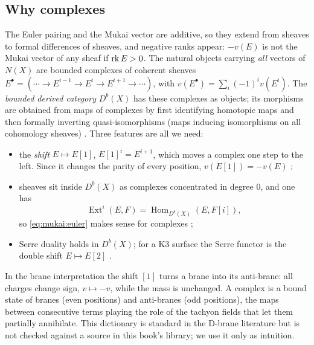 \subsection{Why complexes}
The Euler pairing and the Mukai vector are additive, so they extend from sheaves to formal
differences of sheaves, and negative ranks appear: $-v(E)$ is not the Mukai vector of any sheaf if
$\operatorname{rk} E>0$. The natural objects carrying \emph{all} vectors of $N(X)$ are bounded complexes of
coherent sheaves
$E^\bullet=(\cdots\to E^{i-1}\to E^i\to E^{i+1}\to\cdots)$, with
$v(E^\bullet)=\sum_i(-1)^iv(E^i)$. The \emph{bounded derived category}
$D^b(X)$ has these complexes as objects; its morphisms are obtained from maps of complexes by
first identifying homotopic maps and then formally inverting quasi-isomorphisms (maps inducing
isomorphisms on all cohomology sheaves) . Three
features are all we need:
\begin{itemize}[leftmargin=*]
\item the \emph{shift} $E\mapsto E[1]$, $E[1]^i=E^{i+1}$, which moves a complex one step to the
  left. Since it changes the parity of every position, $v(E[1])=-v(E)$
  ;
\item sheaves sit inside $D^b(X)$ as complexes concentrated in degree $0$, and one has
  \[\operatorname{Ext}^i(E,F)=\operatorname{Hom}_{D^b(X)}(E,F[i]),\]
  so \eqref{eq:mukai:euler} makes sense for complexes ;
\item Serre duality holds in $D^b(X)$; for a K3 surface the Serre functor is the double shift
  $E\mapsto E[2]$ .
\end{itemize}

\begin{physicsbox}
In the brane interpretation the shift $[1]$ turns a brane into its anti-brane: all charges
change sign, $v\mapsto-v$, while the mass is unchanged. A complex is a bound state of branes (even
positions) and anti-branes (odd positions), the maps between consecutive terms playing the role
of the tachyon fields that let them partially annihilate. This dictionary is standard in the
D-brane literature but is not checked against a source in this book's library; we use it only as
intuition.
\end{physicsbox}

